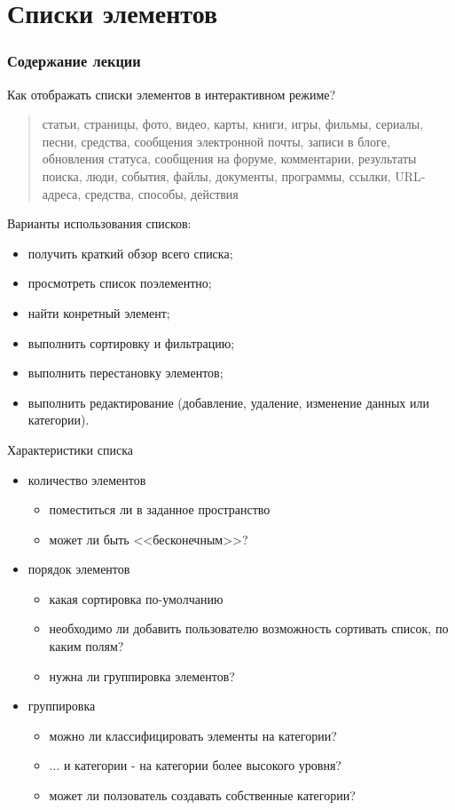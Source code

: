 \documentclass{beamer}
\begin{document}
\section{Списки элементов}
\begin{frame}
  \frametitle{Содержание лекции}
  \tableofcontents[current]
\end{frame}

\begin{frame}[t]
	Как отображать списки элементов в интерактивном режиме?
	\begin{quotation}
	статьи, страницы, фото, видео,
карты, книги, игры, фильмы, сериалы, песни, средства, сообщения электронной почты, записи в блоге,
обновления статуса, сообщения на форуме, комментарии, результаты поиска, люди, события, файлы, документы,
программы, ссылки, URL-адреса, средства, способы, действия	
	\end{quotation}

	Варианты использования списков:
	\begin{itemize}
		\item получить краткий обзор всего списка;
		\item просмотреть список поэлементно;
		\item найти конретный элемент;
		\item выполнить сортировку и фильтрацию;
		\item выполнить перестановку элементов;
		\item выполнить	редактирование (добавление, удаление, изменение данных или категории).
	\end{itemize}
\end{frame}	

\begin{frame}{Характеристики списка}
	\begin{itemize}
		\item количество элементов
		\begin{itemize}
			\item поместиться ли в заданное пространство
			\item может ли быть <<бесконечным>>?			
		\end{itemize}
		\item порядок элементов		
		\begin{itemize}
			\item какая сортировка по-умолчанию
			\item необходимо ли добавить пользователю возможность сортивать список, по каким полям?
			\item нужна ли группировка элементов?			
		\end{itemize}
		\item группировка
		\begin{itemize}
			\item можно ли классифицировать элементы на категории?
			\item ... и категории - на категории более высокого уровня?
			\item может ли ползователь создавать собственные категории?
		\end{itemize}	
	\end{itemize}
\end{frame}	
\end{document}
